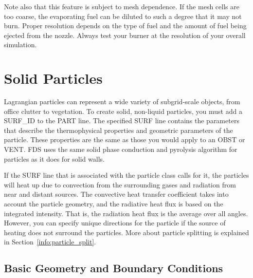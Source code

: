 \documentclass[11pt]{book}
\begin{document}
Note also that this feature is subject to mesh
dependence. If the mesh cells are too coarse, the
evaporating fuel can be diluted to such a degree that it
may not burn. Proper resolution depends on the type of
fuel and the amount of fuel being ejected from the
nozzle. Always test your burner at the resolution of your overall simulation.


\clearpage

\section{Solid Particles}
\label{info:PART_SURF}

Lagrangian particles can represent a wide variety of subgrid-scale objects, from office clutter to vegetation. To create solid, non-liquid particles, you must add a {\ct SURF\_ID} to the {\ct PART} line. The specified {\ct SURF} line contains the parameters that describe the thermophysical properties and geometric parameters of the particle. These properties are the same as those you would apply to an {\ct OBST} or {\ct VENT}. FDS uses the same solid phase conduction and pyrolysis algorithm for particles as it does for solid walls.

If the {\ct SURF} line that is associated with the particle class calls for it, the particles will heat up due to convection from the surrounding gases and radiation from near and distant sources. The convective heat transfer coefficient takes into account the particle geometry, and the radiative heat flux is based on the integrated intensity. That is, the radiation heat flux is the average over all angles. However, you can specify unique directions for the particle if the source of heating does not surround the particles. More about particle splitting is explained in Section~\ref{info:particle_split}.


\subsection{Basic Geometry and Boundary Conditions}
\label{info:PART_GEOMETRY}
\end{document}
